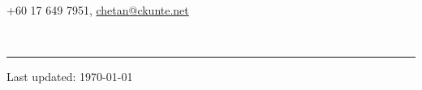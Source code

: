 \documentclass[10pt]{article}
\begin{document}
\begin{flushleft}
  \textrm{\LARGE{\theauthor}} \\
  +60 17 649 7951, \href{mailto:chetan@ckunte.net}{chetan@ckunte.net} \hfill
\end{flushleft}




~\hrule

\begin{multicols}{2}









\end{multicols}

\vfill{}

\begin{center}
  \scriptsize{Last updated: \today} %
\end{center}
\end{document}
